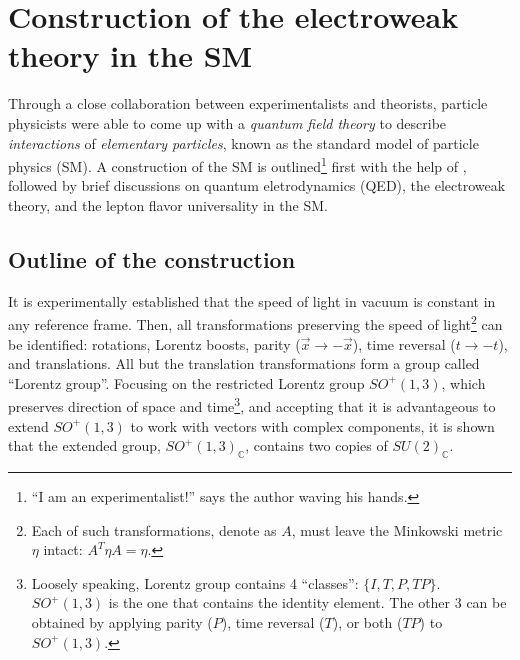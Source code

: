 \section{Construction of the electroweak theory in the SM}

Through a close collaboration between experimentalists and theorists,
particle physicists were able to come up with a \emph{quantum field theory}
to describe \emph{interactions} of \emph{elementary particles},
known as the standard model of particle physics (SM).
A construction of the SM is outlined\footnote{
    ``I am an experimentalist!'' says the author waving his hands.
} first with the help of
\cite{Robinson_2011,Schwichtenberg_2018},
followed by brief discussions on quantum eletrodynamics (QED),
the electroweak theory, and the lepton flavor universality in the SM.


\subsection{Outline of the construction}

It is experimentally established that the speed of light in vacuum is constant
in any reference frame.
Then, all transformations preserving the speed of light\footnote{
    Each of such transformations, denote as $A$, must leave the Minkowski metric
    $\eta$ intact: $A^T \eta A = \eta$.
} can be identified:
rotations, Lorentz boosts, parity ($\vec{x} \rightarrow -\vec{x}$),
time reversal ($t \rightarrow -t$), and translations.
All but the translation transformations form a group called
``Lorentz group''.
Focusing on the restricted Lorentz group $SO^+(1, 3)$,
which preserves direction of space and time\footnote{
    Loosely speaking, Lorentz group contains 4 ``classes'': $\{I, T, P, TP\}$.
    $SO^+(1,3)$ is the one that contains the identity element.
    The other 3 can be obtained by applying parity ($P$), time reversal ($T$),
    or both ($TP$) to $SO^+(1,3)$.
},
and accepting that it is advantageous to extend $SO^+(1,3)$ to work with vectors
with complex components,
it is shown that the extended group, $SO^+(1,3)_\mathbb{C}$,
contains two copies of $SU(2)_\mathbb{C}$.

